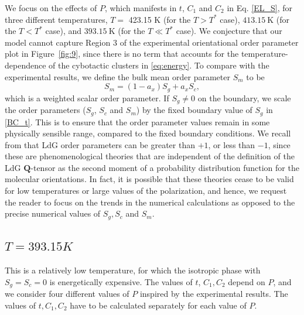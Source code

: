 \documentclass[reprint,amsfonts,amsmath,amssymb,aps,pre,floatfix,10pt]{revtex4-1}
\newcommand\Qvec{\mathbf{Q}}
\begin{document}
We focus on the effects of $P$, which manifests in $t$, $C_1$ and $C_2$ in Eq. \ref{EL_S}, for three different temperatures, \(T=\) 423.15 K (for the \(T > T^*\) case), \(413.15 \mathrm{~K}\) (for the \(T < T^*\) case),  and \(393.15 \mathrm{~K}\) (for the \(T \ll T^*\) case). We conjecture that our model cannot capture Region $3$ of the experimental orientational order parameter plot in Figure~\ref{fig:9}, since there is no term that accounts for the temperature-dependence of the cybotactic clusters in \eqref{eq:energy}. To compare with the experimental results, we define the bulk mean order parameter $S_m$ to be
\begin{equation}
  S_m = (1 - a_x) S_g + a_x S_c,
\end{equation}
which is a weighted scalar order parameter. If $S_g \neq 0$ on the boundary, we scale the order parameters ($S_g$, $S_c$ and $S_m$) by the fixed boundary value of $S_g$ in \eqref{BC_t}. This is to ensure that the order parameter values remain in some physically sensible range, compared to the fixed boundary conditions. We recall from \cite{majumdar2010equilibrium_63} that LdG order parameters can be greater than $+1$, or less than $-1$, since these are phenomenological theories that are independent of the definition of the LdG $\Qvec$-tensor as the second moment of a probability distribution function for the molecular orientations. In fact, it is possible that these theories cease to be valid for low temperatures or large values of the polarization, and hence, we request the reader to focus on the trends in the numerical calculations as opposed to the precise numerical values of $S_g, S_c$ and $S_m$.




\subsection{$T = 393.15 K$}
This is a relatively low temperature, for which the isotropic phase with $S_g = S_c=0$ is energetically expensive. The values of $t$, $C_1, C_2$ depend on $P$, and we consider four different values of $P$ inspired by the experimental results. The values of $t, C_1, C_2$ have to be calculated separately for each value of $P$.
\end{document}
